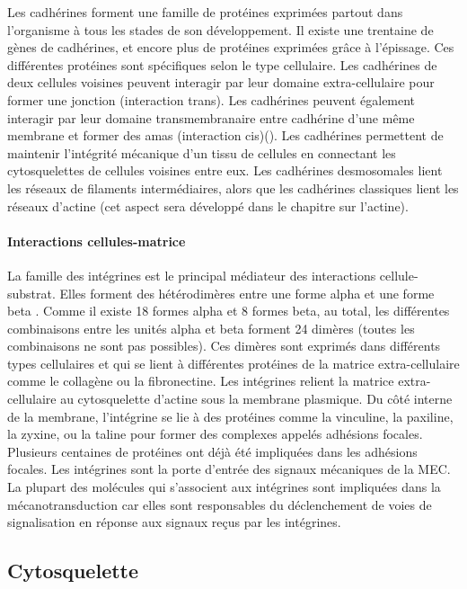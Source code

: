 Les cadhérines forment une famille de protéines exprimées partout dans l'organisme à tous les stades de son développement. 
Il existe une trentaine de gènes de cadhérines, et encore plus de protéines exprimées grâce à l'épissage. Ces différentes protéines sont spécifiques selon le type cellulaire.
Les cadhérines de deux cellules voisines peuvent interagir par leur domaine extra-cellulaire pour former une jonction (interaction trans). Les cadhérines peuvent également interagir par leur domaine transmembranaire entre cadhérine d'une même membrane et former des amas (interaction cis)(\cite{Strale}). 
Les cadhérines permettent de maintenir l'intégrité mécanique d'un tissu de cellules en connectant les cytosquelettes de cellules voisines entre eux. Les cadhérines desmosomales lient les réseaux de filaments intermédiaires, alors que les cadhérines classiques lient les réseaux d'actine (cet aspect sera développé dans le chapitre sur l'actine). 


\paragraph{Interactions cellules-matrice}

La famille des intégrines est le principal médiateur des interactions cellule-substrat. Elles forment des hétérodimères entre une forme alpha et une forme beta . Comme il existe 18 formes alpha et 8 formes beta, au total, les différentes combinaisons entre les unités alpha et beta forment 24 dimères (toutes les combinaisons ne sont pas possibles).  Ces dimères sont exprimés dans différents types cellulaires et qui se lient à différentes protéines de la matrice extra-cellulaire comme le collagène ou la fibronectine. 
Les intégrines relient la matrice extra-cellulaire au cytosquelette d'actine sous la membrane plasmique. Du côté interne de la membrane, l'intégrine se lie à des protéines comme la vinculine, la paxiline, la zyxine, ou la taline pour former des complexes appelés adhésions focales. Plusieurs centaines de protéines ont déjà été impliquées dans les adhésions focales. 
Les intégrines sont la porte d'entrée des signaux mécaniques de la MEC. La plupart des molécules qui s'associent aux intégrines sont impliquées dans la mécanotransduction car elles sont responsables du déclenchement de voies de signalisation en réponse aux signaux reçus par les intégrines. 

\subsection{Cytosquelette}

